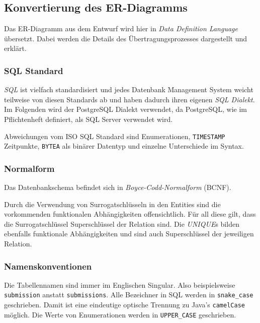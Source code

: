 
\subsection{Konvertierung des ER-Diagramms}

Das ER-Diagramm aus dem Entwurf wird hier in \emph{Data Definition Language} übersetzt. Dabei werden die Details des Übertragungsprozesses dargestellt und erklärt.

\subsubsection{SQL Standard}

\emph{SQL} ist vielfach standardisiert und jedes Datenbank Management System weicht teilweise von diesen Standards ab und haben dadurch ihren eigenen \emph{SQL Dialekt}. Im Folgenden wird der PostgreSQL Dialekt verwendet, da PostgreSQL, wie im Pflichtenheft definiert, als SQL Server verwendet wird.

Abweichungen vom ISO SQL Standard sind Enumerationen, \texttt{TIMESTAMP} Zeitpunkte, \texttt{BYTEA} als binärer Datentyp und einzelne Unterschiede im Syntax.

\subsubsection{Normalform}

Das Datenbankschema befindet sich in \emph{Boyce-Codd-Normalform} (BCNF).

Durch die Verwendung von Surrogatschlüsseln in den Entities sind die vorkommenden funktionalen Abhängigkeiten offensichtlich. Für all diese gilt, dass die Surrogatschlüssel Superschlüssel der Relation sind. Die \emph{UNIQUE}s bilden ebenfalls funktionale Abhängigkeiten und sind auch Superschlüssel der jeweiligen Relation.

\subsubsection{Namenskonventionen}

Die Tabellennamen sind immer im Englischen Singular. Also beispielsweise \texttt{submission} anstatt \texttt{submissions}.
Alle Bezeichner in SQL werden in \texttt{snake\_case} geschrieben. Damit ist eine eindeutige optische Trennung zu Java's \texttt{camelCase} möglich. Die Werte von Enumerationen werden in \texttt{UPPER\_CASE} geschrieben.


